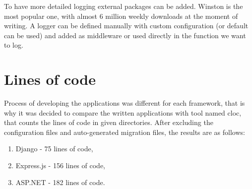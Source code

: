 To have more detailed logging external packages can be added. Winston is the most popular one, with almost 6 million weekly downloads at the moment of writing. A logger can be defined manually with custom configuration (or default can be used) and added as middleware or used directly in the function we want to log.

\section{Lines of code}

Process of developing the applications was different for each framework, that is why it was decided to compare the written applications with tool named \acrshort{cloc}, that counts the lines of code in given directories. After excluding the configuration files and auto-generated migration files, the results are as follows:
\begin{enumerate}
      \item Django - 75 lines of code,
      \item Express.js - 156 lines of code,
      \item ASP.NET - 182 lines of code.
\end{enumerate}
